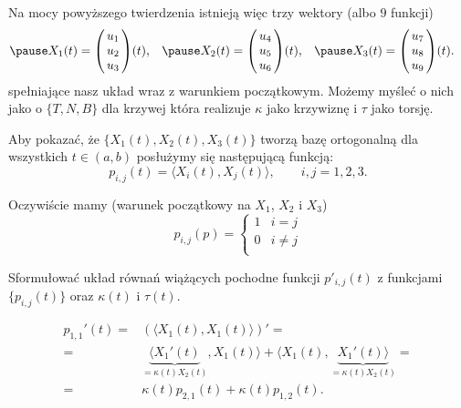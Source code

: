 \begin{frame}[<+->]
Na mocy powyższego twierdzenia istnieją więc trzy wektory (albo $9$ funkcji) 
\begin{align*}
\pause X_1(t)&=\left(\!\!\begin{array}{c}
u_1\\u_2\\u_3
\end{array}\!\!\right)\!(t),&
\pause X_2(t)&=\left(\!\!\begin{array}{c}
u_4\\u_5\\u_6
\end{array}\!\!\right)\!(t),&
\pause X_3(t)&=\left(\!\!\begin{array}{c}
u_7\\u_8\\u_9
\end{array}\!\!\right)\!(t).
\end{align*}
spełniające nasz układ wraz z warunkiem początkowym. \pause Możemy myśleć o nich jako o $\{T,N,B\}$ dla krzywej która realizuje $\kappa$ jako krzywiznę i $\tau$ jako torsję.

\pause Aby pokazać, że $\{X_1(t),X_2(t),X_3(t)\}$ tworzą bazę ortogonalną dla wszystkich $t\in (a,b)$ posłużymy się następującą funkcją: \[p_{i,j}(t)=\langle X_i(t),X_j(t)\rangle, \qquad i,j=1,2,3.\]

\pause Oczywiście mamy (warunek początkowy na $X_1$, $X_2$ i $X_3$)
\begin{equation}\label{eqn:initial-cond}
p_{i,j}(p)=
\begin{cases}
1 & i=j\\
0 & i\neq j\\
\end{cases}
\end{equation}
\end{frame}
\begin{frame}[<+->]
\begin{exercise}
Sformułować układ równań wiążących pochodne funkcji $p'_{i,j}(t)$ z funkcjami $\{p_{i,j}(t)\}$ oraz $\kappa(t)$ i $\tau(t)$.
\end{exercise}

\begin{przyklad}\vspace*{-0.25in}
\[\begin{split}
p_{1,1}'(t)=&\left(\langle X_1(t),X_1(t)\rangle\right)'=\\
=&\underbrace{\langle X_1'(t)}_{=\kappa(t)X_2(t)},X_1(t)\rangle+\langle X_1(t),\underbrace{X_1'(t)\rangle}_{=\kappa(t) X_2(t)}=\\=&\kappa(t) p_{2,1}(t)+\kappa(t)p_{1,2}(t).
\end{split}
\]
\end{przyklad}

\end{frame}
